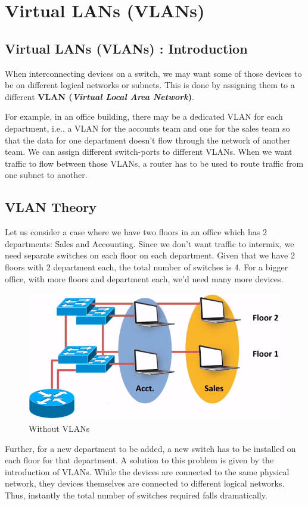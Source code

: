 \chapter{Virtual LANs (VLANs)}

\section{Virtual LANs (VLANs) : Introduction}
When interconnecting devices on a switch, we may want some of those devices to be on different logical networks or subnets. This is done by assigning them to a different \textbf{VLAN (\textit{Virtual Local Area Network})}. 

For example, in an office building, there may be a dedicated VLAN for each department, i.e., a VLAN for the accounts team and one for the sales team so that the data for one department doesn't flow through the network of another team. We can assign different switch-ports to different VLANs. When we want traffic to flow between those VLANs, a router has to be used to route traffic from one subnet to another. 

\section{VLAN Theory}
Let us consider a case where we have two floors in an office which has 2 departments: Sales and Accounting. Since we don't want traffic to intermix, we need separate switches on each floor on each department. Given that we have 2 floors with 2 department each, the total number of switches is 4. For a bigger office, with more floors and department each, we'd need many more devices. 

\begin{figure}[H]
	\centering
	\includegraphics[width=0.7\linewidth]{"ICND1/1. Switches/chapters/2.2.a Without VLANs"}
	\caption{Without VLANs}
	\label{fig:2}
\end{figure}

\noindent
Further, for a new department to be added, a new switch has to be installed on each floor for that department. A solution to this problem is given by the introduction of VLANs. While the devices are connected to the same physical network, they devices themselves are connected to different logical networks. Thus, instantly the total number of switches required falls dramatically. 

